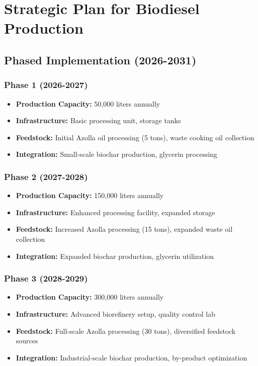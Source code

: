 \section{Strategic Plan for Biodiesel Production}

\subsection{Phased Implementation (2026-2031)}

\subsubsection{Phase 1 (2026-2027)}
\begin{itemize}
    \item \textbf{Production Capacity:} 50,000 liters annually
    \item \textbf{Infrastructure:} Basic processing unit, storage tanks
    \item \textbf{Feedstock:} Initial Azolla oil processing (5 tons), waste cooking oil collection
    \item \textbf{Integration:} Small-scale biochar production, glycerin processing
\end{itemize}

\subsubsection{Phase 2 (2027-2028)}
\begin{itemize}
    \item \textbf{Production Capacity:} 150,000 liters annually
    \item \textbf{Infrastructure:} Enhanced processing facility, expanded storage
    \item \textbf{Feedstock:} Increased Azolla processing (15 tons), expanded waste oil collection
    \item \textbf{Integration:} Expanded biochar production, glycerin utilization
\end{itemize}

\subsubsection{Phase 3 (2028-2029)}
\begin{itemize}
    \item \textbf{Production Capacity:} 300,000 liters annually
    \item \textbf{Infrastructure:} Advanced biorefinery setup, quality control lab
    \item \textbf{Feedstock:} Full-scale Azolla processing (30 tons), diversified feedstock sources
    \item \textbf{Integration:} Industrial-scale biochar production, by-product optimization
\end{itemize}

